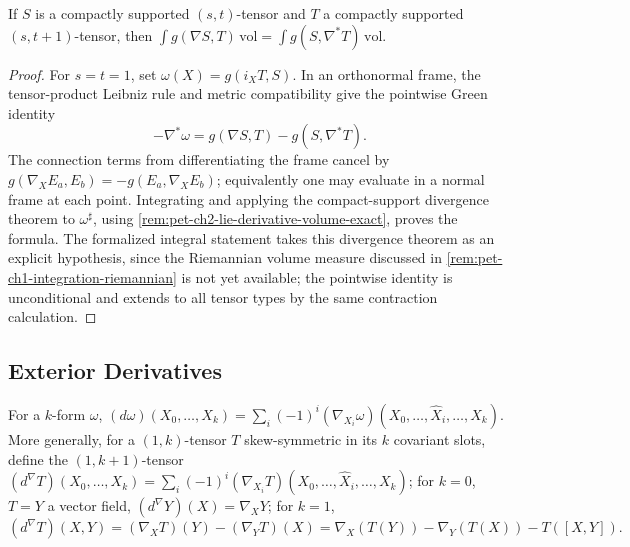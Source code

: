 \begin{proposition}
  \label{prop:pet-ch2-adjoint-integral-identity}


  If $S$ is a compactly supported $(s,t)$-tensor and $T$ a compactly supported
  $(s,t+1)$-tensor, then $\int g(\nabla S,T)\,\mathrm{vol}=\int g(S,\nabla^*T)\,\mathrm{vol}$.
\end{proposition}
\begin{proof}
  \sketch
  For $s=t=1$, set
  $\omega(X)=g(i_XT,S)$. In an orthonormal frame, the tensor-product
  Leibniz rule and metric compatibility give the pointwise Green identity
  \[
    -\nabla^*\omega=g(\nabla S,T)-g(S,\nabla^*T).
  \]
  The connection terms from differentiating the frame cancel by
  $g(\nabla_XE_a,E_b)=-g(E_a,\nabla_XE_b)$; equivalently one may evaluate in a
  normal frame at each point. Integrating and applying the compact-support
  divergence theorem to $\omega^\sharp$, using
  \cref{rem:pet-ch2-lie-derivative-volume-exact}, proves the formula. The
  formalized integral statement takes this divergence theorem as an explicit
  hypothesis, since the Riemannian volume measure discussed in
  \cref{rem:pet-ch1-integration-riemannian} is not yet available; the pointwise
  identity is unconditional and extends to all tensor types by the same
  contraction calculation.
\end{proof}

\subsection{Exterior Derivatives}

\begin{definition}
  \label{def:pet-ch2-exterior-derivative-covariant}


  For a $k$-form $\omega$, $(d\omega)(X_0,\dots,X_k)=\sum_i(-1)^i(\nabla_{X_i}\omega)(X_0,\dots,\hat X_i,\dots,X_k)$.
  More generally, for a $(1,k)$-tensor $T$ skew-symmetric in its $k$
  covariant slots, define the $(1,k+1)$-tensor
  $(d^\nabla T)(X_0,\dots,X_k)=\sum_i(-1)^i(\nabla_{X_i}T)(X_0,\dots,\hat X_i,\dots,X_k)$;
  for $k=0$, $T=Y$ a vector field, $(d^\nabla Y)(X)=\nabla_XY$; for $k=1$,
  \[
    (d^\nabla T)(X,Y)=(\nabla_XT)(Y)-(\nabla_YT)(X)
    =\nabla_X(T(Y))-\nabla_Y(T(X))-T([X,Y]).
  \]
\end{definition}


